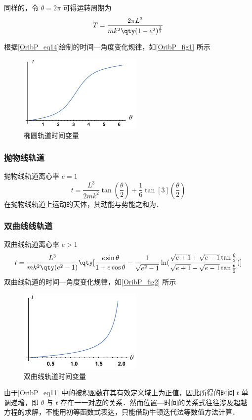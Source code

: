 同样的，令 $\theta=2\pi$ 可得运转周期为
\begin{equation}
T=\frac{2\pi L^3}{mk^2\qty(1-e^2)^{\frac{3}{2}}}
\end{equation}

根据\autoref{OribP_eq14}绘制的时间—角度变化规律，如\autoref{OribP_fig1} 所示
\begin{figure}[ht]
\centering
\includegraphics[width=6cm]{./figures/OribP1.pdf}
\caption{椭圆轨道时间变量} \label{OribP_fig1}
\end{figure}

\subsubsection{抛物线轨道}
抛物线轨道离心率 $e=1$
\begin{equation}
t = \frac{L^3}{2mk^2}\tan(\frac{\theta}{2})+\frac{1}{6}\tan[3](\frac{\theta}{2})
\end{equation}
在抛物线轨道上运动的天体，其动能与势能之和为．

\subsubsection{双曲线线轨道}
双曲线轨道离心率 $e>1$
\begin{equation}
t = \frac{L^3}{mk^2\qty(e^2-1)}\qty[\frac{e\sin\theta}{1+e\cos\theta}-\frac{1}{\sqrt{e^2-1}}\ln(\frac{\sqrt{e+1}+\sqrt{e-1}\tan\frac{\theta}{2}}{\sqrt{e+1}-\sqrt{e-1}\tan\frac{\theta}{2}})]
\end{equation}
双曲线轨道的时间—角度变化规律，如\autoref{OribP_fig2} 所示
\begin{figure}[ht]
\centering
\includegraphics[width=6cm]{./figures/OribP2.pdf}
\caption{双曲线轨道时间变量} \label{OribP_fig2}
\end{figure}


由于\autoref{OribP_eq11} 中的被积函数在其有效定义域上为正值，因此所得的时间 $t$ 单调递增，即 $\theta$ 与 $t$ 存在一一对应的关系．然而位置—时间的关系式往往涉及超越方程的求解，不能用初等函数式表达，只能借助牛顿迭代法等数值方法计算．

